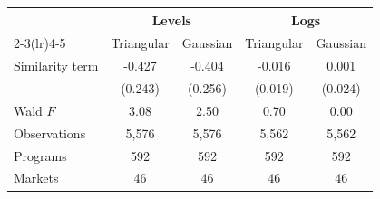 \begin{tabular}{lcccc}
\toprule
 & \multicolumn{2}{c}{Levels} & \multicolumn{2}{c}{Logs} \\
\cmidrule(lr){2-3}\cmidrule(lr){4-5}
 & Triangular & Gaussian & Triangular & Gaussian \\
\midrule
Similarity term & -0.427\sym{*} & -0.404 & -0.016 &  0.001 \\
 & (0.243) & (0.256) & (0.019) & (0.024) \\
Wald \(F\) &  3.08 &  2.50 &  0.70 &  0.00 \\
Observations &     5,576 &     5,576 &     5,562 &     5,562 \\
Programs &       592 &       592 &       592 &       592 \\
Markets &        46 &        46 &        46 &        46 \\
\bottomrule
\end{tabular}
